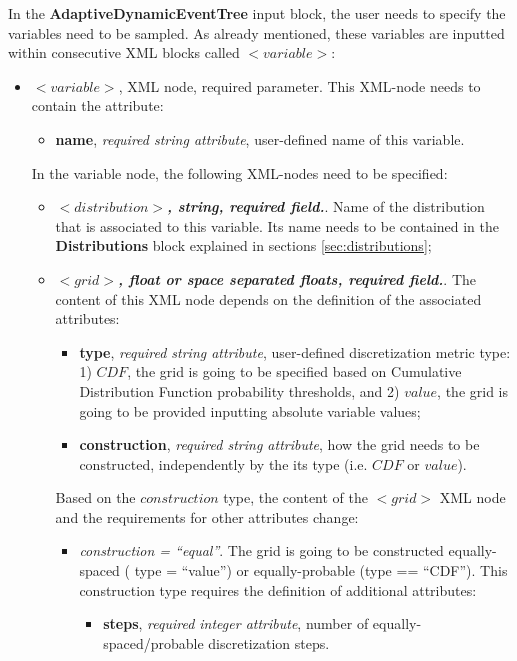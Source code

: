 In the \textbf{AdaptiveDynamicEventTree} input block, the user needs to specify the variables need to be sampled. As already mentioned, these variables are inputted within consecutive XML blocks called $<variable>$:
\begin{itemize}
\item $<variable>$, XML node, required parameter. This XML-node needs to contain the attribute:
\begin{itemize}
  \item \textbf{name}, \textit{required string attribute}, user-defined name of this variable.
 \end{itemize}
 In the variable node, the following XML-nodes need to be specified:
 \begin{itemize}
    \item $<distribution>$\textbf{\textit{, string, required field.}}. Name of the distribution that is associated to this variable. Its name needs to be contained in the \textbf{Distributions} block explained in sections \ref{sec:distributions};
    \item $<grid>$\textbf{\textit{, float or space separated floats, required field.}}. The content of this XML node depends on the definition of the associated attributes:
\begin{itemize}
\itemsep0em
\item \textbf{type}, \textit{required string attribute}, user-defined discretization metric type: 1) $CDF$, the grid is going to be specified based on  Cumulative Distribution Function probability thresholds, and 2) $value$, the grid is going to be provided inputting absolute variable values;
\item \textbf{construction}, \textit{required string attribute}, how the grid needs to be constructed, independently by the its type (i.e. $CDF$ or $value$).
\end{itemize}
Based on the $construction$ type, the content of the $<grid>$ XML node and the requirements for other attributes change:
\begin{itemize}
  \item \textit{construction = ``equal''}. The grid is going to be constructed equally-spaced ( type = ``value'') or equally-probable (type == ``CDF''). This construction type requires the definition of additional attributes:
      \begin{itemize}
         \item \textbf{steps}, \textit{required integer attribute}, number of equally-spaced/probable discretization steps.

\end{itemize}
\end{itemize}
\end{itemize}
\end{itemize}
